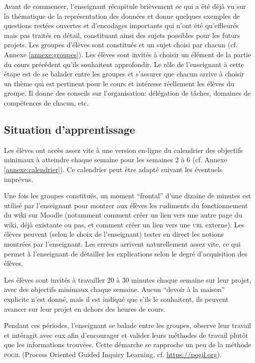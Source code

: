 \documentclass[11pt,bibliography=totoc]{scrartcl}
\newcommand\ajout[1]{{\color{blue} #1}}
\newcommand\rajout[1]{{\color{green} #1}}
\begin{document}
\rajout{Avant de commencer, l'enseignant récapitule brièvement ce qui a été déjà
  vu sur la thématique de la représentation des données et donne quelques
  exemples de questions restées ouvertes et d'encodages importants qui n'ont été
  qu'effleurés mais pas traités en détail, constituant ainsi des sujets
  possibles pour les futurs projets.}  Les groupes d'élèves sont constitués et
un sujet choisi par chacun (cf. Annexe \ref{annexe:groupes}). Les élèves sont
invités à choisir un élément de la partie du cours précédent qu'ils souhaitent
approfondir. Le rôle de l'enseignant à cette étape est de se balader entre les
groupes et s'assurer que chacun arrive à choisir un thème qui est pertinent pour
le cours et intéresse réellement les élèves du groupe. \ajout{Il donne des
  conseils sur l'organisation: délégation de tâches, domaines de compétences de
  chacun, etc.}

\subsection{Situation d'apprentissage}
Les élèves ont accès assez vite à une version en-ligne du calendrier des
objectifs minimaux à atteindre chaque semaine pour les semaines 2 à 6
\rajout{(cf. Annexe \ref{annexe:calendrier})}. Ce calendrier peut être adapté
suivant les éventuels imprévus.

Une fois les groupes constitués, un moment ``frontal'' d'une dizaine de minutes
est utilisé par l'enseignant pour montrer aux élèves les rudiments du
fonctionnement du wiki sur Moodle (notamment comment créer un lien vers une
autre page du wiki, déjà existante ou pas, et comment créer un lien vers une
\textsc{url} externe). \ajout {Les élèves peuvent (selon le choix de
  l'enseignant) tester en direct les notions montrées par l'enseignant. Les
  erreurs arrivent naturellement assez vite, ce qui permet à l'enseignant de
  détailler les explications selon le degré d'acquisition des élèves.}

Les élèves sont invités à travailler 20 à 30 minutes chaque semaine sur leur
projet, avec des objectifs minimaux chaque semaine. Aucun ``devoir à la maison''
explicite n'est donné, mais il est indiqué que s'ils le souhaitent, ils peuvent
avancer sur leur projet en dehors des heures de cours.

\rajout{Pendant ces périodes, l'enseignant se balade entre les groupes, observe
  leur travail et intéragit avec eux afin d'encourager et valider leurs méthodes
  de travail plutôt que les informations trouvées. Cette démarche se rapproche
  un peu de la méthode \textsc{pogil} (Process Oriented Guided Inquiry Learning,
  cf. \url{https://pogil.org}).}
\end{document}

